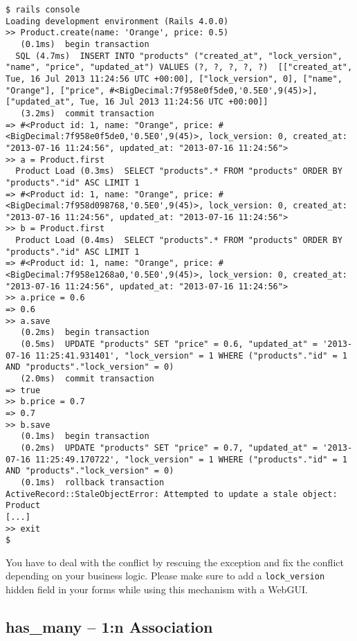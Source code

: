 \documentclass[a4paper]{book}
\begin{document}
\begin{shaded}\begin{verbatim}
$ rails console
Loading development environment (Rails 4.0.0)
>> Product.create(name: 'Orange', price: 0.5)
   (0.1ms)  begin transaction
  SQL (4.7ms)  INSERT INTO "products" ("created_at", "lock_version", "name", "price", "updated_at") VALUES (?, ?, ?, ?, ?)  [["created_at", Tue, 16 Jul 2013 11:24:56 UTC +00:00], ["lock_version", 0], ["name", "Orange"], ["price", #<BigDecimal:7f958e0f5de0,'0.5E0',9(45)>], ["updated_at", Tue, 16 Jul 2013 11:24:56 UTC +00:00]]
   (3.2ms)  commit transaction
=> #<Product id: 1, name: "Orange", price: #<BigDecimal:7f958e0f5de0,'0.5E0',9(45)>, lock_version: 0, created_at: "2013-07-16 11:24:56", updated_at: "2013-07-16 11:24:56">
>> a = Product.first
  Product Load (0.3ms)  SELECT "products".* FROM "products" ORDER BY "products"."id" ASC LIMIT 1
=> #<Product id: 1, name: "Orange", price: #<BigDecimal:7f958d098768,'0.5E0',9(45)>, lock_version: 0, created_at: "2013-07-16 11:24:56", updated_at: "2013-07-16 11:24:56">
>> b = Product.first
  Product Load (0.4ms)  SELECT "products".* FROM "products" ORDER BY "products"."id" ASC LIMIT 1
=> #<Product id: 1, name: "Orange", price: #<BigDecimal:7f958e1268a0,'0.5E0',9(45)>, lock_version: 0, created_at: "2013-07-16 11:24:56", updated_at: "2013-07-16 11:24:56">
>> a.price = 0.6
=> 0.6
>> a.save
   (0.2ms)  begin transaction
   (0.5ms)  UPDATE "products" SET "price" = 0.6, "updated_at" = '2013-07-16 11:25:41.931401', "lock_version" = 1 WHERE ("products"."id" = 1 AND "products"."lock_version" = 0)
   (2.0ms)  commit transaction
=> true
>> b.price = 0.7
=> 0.7
>> b.save
   (0.1ms)  begin transaction
   (0.2ms)  UPDATE "products" SET "price" = 0.7, "updated_at" = '2013-07-16 11:25:49.170722', "lock_version" = 1 WHERE ("products"."id" = 1 AND "products"."lock_version" = 0)
   (0.1ms)  rollback transaction
ActiveRecord::StaleObjectError: Attempted to update a stale object: Product
[...]
>> exit
$
\end{verbatim}\end{shaded}

You have to deal with the conflict by rescuing the exception and fix the conflict depending on your business logic. Please make sure to add a \texttt{lock\_version} hidden field in your forms while using this mechanism with a WebGUI.

\subsection{has\_many -- 1:n Association}\label{hasux5fmany-1n-association}
\end{document}

